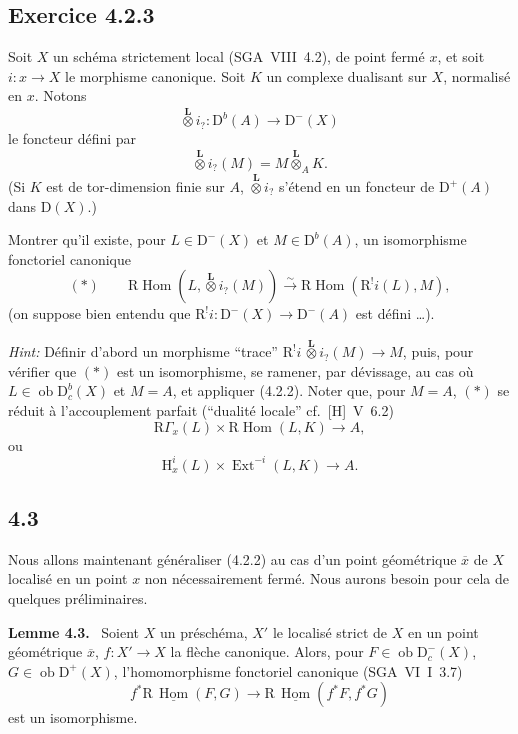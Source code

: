 \documentclass[11pt]{article}
\newenvironment{statement}[1]{\par\medskip\noindent\textbf{#1.}\ }{\par\medskip}
\renewcommand{\H}{\mathrm{H}}
\DeclareMathOperator{\Hom}{Hom}
\DeclareMathOperator{\Ext}{Ext}
\newcommand{\R}{\mathrm{R}}
\newcommand{\D}{\mathrm{D}}
\newcommand{\ob}{\operatorname{ob}}
\newcommand{\ol}[1]{\overline{#1}}
\begin{document}
\subsection*{Exercice 4.2.3}
Soit $X$ un schéma strictement local (SGA~VIII~4.2), de point fermé $x$, et soit $i:x\to X$ le morphisme canonique. Soit $K$ un complexe dualisant sur $X$, normalisé en $x$. Notons
\[
\overset{\mathbf L}{\otimes} i_? : \D^b(A)\longrightarrow \D^-(X)
\]
le foncteur défini par
\[
\overset{\mathbf L}{\otimes} i_?(M)=M\overset{\mathbf L}{\otimes}_A K.
\]
(Si $K$ est de tor-dimension finie sur $A$, $\overset{\mathbf L}{\otimes} i_?$ s'étend en un foncteur de $\D^+(A)$ dans $\D(X)$.)

Montrer qu'il existe, pour $L\in\D^-(X)$ et $M\in\D^b(A)$, un isomorphisme fonctoriel canonique
\[
(*)\qquad \R\Hom(L,\overset{\mathbf L}{\otimes} i_?(M))\xrightarrow{\sim}\R\Hom(\R^{!}i(L),M),
\]
(on suppose bien entendu que $\R^{!}i:\D^-(X)\to\D^-(A)$ est défini \dots).

\emph{Hint:} Définir d'abord un morphisme ``trace'' $\R^{!}i\,\overset{\mathbf L}{\otimes}i_?(M)\to M$, puis, pour vérifier que $(*)$ est un isomorphisme, se ramener, par dévissage, au cas où $L\in\ob\D_c^b(X)$ et $M=A$, et appliquer (4.2.2). Noter que, pour $M=A$, $(*)$ se réduit à l'accouplement parfait (``dualité locale'' cf.~[H]~V~6.2)
\[
\R\Gamma_x(L)\times \R\Hom(L,K)\longrightarrow A,
\]
ou
\[
\H_x^i(L)\times \Ext^{-i}(L,K)\longrightarrow A.
\]

\subsection*{4.3}
Nous allons maintenant généraliser (4.2.2) au cas d'un point géométrique $\ol{x}$ de $X$ localisé en un point $x$ non nécessairement fermé. Nous aurons besoin pour cela de quelques préliminaires.

\begin{statement}{Lemme 4.3}
Soient $X$ un préschéma, $X'$ le localisé strict de $X$ en un point géométrique $\ol{x}$, $f:X'\to X$ la flèche canonique. Alors, pour $F\in\ob\D_c^-(X)$, $G\in\ob\D^+(X)$, l'homomorphisme fonctoriel canonique (SGA~VI~I~3.7)
\[
f^*\R\,\underline{\Hom}(F,G)\longrightarrow \R\,\underline{\Hom}(f^*F,f^*G)
\]
est un isomorphisme.
\end{statement}
\end{document}
